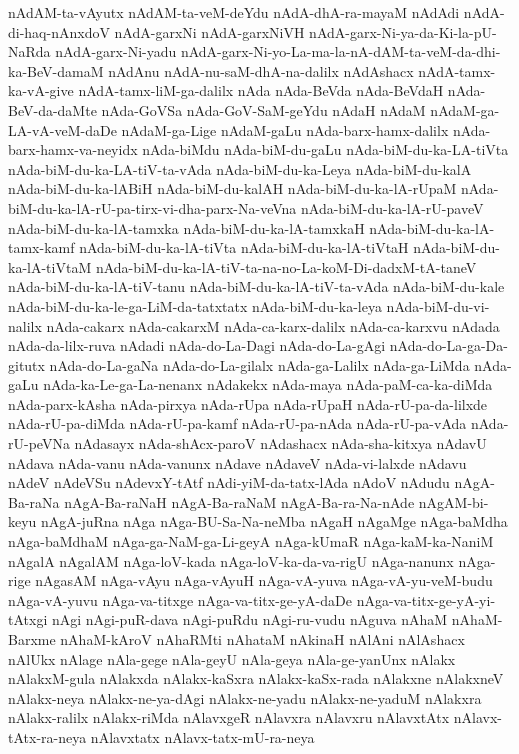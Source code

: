 {nAdAM-ta-vAyutx
nAdAM-ta-veM-deYdu
nAdA-dhA-ra-mayaM
nAdAdi
nAdA-di-haq-nAnxdoV
nAdA-garxNi
nAdA-garxNiVH
nAdA-garx-Ni-ya-da-Ki-la-pU-NaRda
nAdA-garx-Ni-yadu
nAdA-garx-Ni-yo-La-ma-la-nA-dAM-ta-veM-da-dhi-ka-BeV-damaM
nAdAnu
nAdA-nu-saM-dhA-na-dalilx
nAdAshacx
nAdA-tamx-ka-vA-give
nAdA-tamx-liM-ga-dalilx
nAda
nAda-BeVda
nAda-BeVdaH
nAda-BeV-da-daMte
nAda-GoVSa
nAda-GoV-SaM-geYdu
nAdaH
nAdaM
nAdaM-ga-LA-vA-veM-daDe
nAdaM-ga-Lige
nAdaM-gaLu
nAda-barx-hamx-dalilx
nAda-barx-hamx-va-neyidx
nAda-biMdu
nAda-biM-du-gaLu
nAda-biM-du-ka-LA-tiVta
nAda-biM-du-ka-LA-tiV-ta-vAda
nAda-biM-du-ka-Leya
nAda-biM-du-kalA
nAda-biM-du-ka-lABiH
nAda-biM-du-kalAH
nAda-biM-du-ka-lA-rUpaM
nAda-biM-du-ka-lA-rU-pa-tirx-vi-dha-parx-Na-veVna
nAda-biM-du-ka-lA-rU-paveV
nAda-biM-du-ka-lA-tamxka
nAda-biM-du-ka-lA-tamxkaH
nAda-biM-du-ka-lA-tamx-kamf
nAda-biM-du-ka-lA-tiVta
nAda-biM-du-ka-lA-tiVtaH
nAda-biM-du-ka-lA-tiVtaM
nAda-biM-du-ka-lA-tiV-ta-na-no-La-koM-Di-dadxM-tA-taneV
nAda-biM-du-ka-lA-tiV-tanu
nAda-biM-du-ka-lA-tiV-ta-vAda
nAda-biM-du-kale
nAda-biM-du-ka-le-ga-LiM-da-tatxtatx
nAda-biM-du-ka-leya
nAda-biM-du-vi-nalilx
nAda-cakarx
nAda-cakarxM
nAda-ca-karx-dalilx
nAda-ca-karxvu
nAdada
nAda-da-lilx-ruva
nAdadi
nAda-do-La-Dagi
nAda-do-La-gAgi
nAda-do-La-ga-Da-gitutx
nAda-do-La-gaNa
nAda-do-La-gilalx
nAda-ga-Lalilx
nAda-ga-LiMda
nAda-gaLu
nAda-ka-Le-ga-La-nenanx
nAdakekx
nAda-maya
nAda-paM-ca-ka-diMda
nAda-parx-kAsha
nAda-pirxya
nAda-rUpa
nAda-rUpaH
nAda-rU-pa-da-lilxde
nAda-rU-pa-diMda
nAda-rU-pa-kamf
nAda-rU-pa-nAda
nAda-rU-pa-vAda
nAda-rU-peVNa
nAdasayx
nAda-shAcx-paroV
nAdashacx
nAda-sha-kitxya
nAdavU
nAdava
nAda-vanu
nAda-vanunx
nAdave
nAdaveV
nAda-vi-lalxde
nAdavu
nAdeV
nAdeVSu
nAdevxY-tAtf
nAdi-yiM-da-tatx-lAda
nAdoV
nAdudu
nAgA-Ba-raNa
nAgA-Ba-raNaH
nAgA-Ba-raNaM
nAgA-Ba-ra-Na-nAde
nAgAM-bi-keyu
nAgA-juRna
nAga
nAga-BU-Sa-Na-neMba
nAgaH
nAgaMge
nAga-baMdha
nAga-baMdhaM
nAga-ga-NaM-ga-Li-geyA
nAga-kUmaR
nAga-kaM-ka-NaniM
nAgalA
nAgalAM
nAga-loV-kada
nAga-loV-ka-da-va-rigU
nAga-nanunx
nAga-rige
nAgasAM
nAga-vAyu
nAga-vAyuH
nAga-vA-yuva
nAga-vA-yu-veM-budu
nAga-vA-yuvu
nAga-va-titxge
nAga-va-titx-ge-yA-daDe
nAga-va-titx-ge-yA-yi-tAtxgi
nAgi
nAgi-puR-dava
nAgi-puRdu
nAgi-ru-vudu
nAguva
nAhaM
nAhaM-Barxme
nAhaM-kAroV
nAhaRMti
nAhataM
nAkinaH
nAlAni
nAlAshacx
nAlUkx
nAlage
nAla-gege
nAla-geyU
nAla-geya
nAla-ge-yanUnx
nAlakx
nAlakxM-gula
nAlakxda
nAlakx-kaSxra
nAlakx-kaSx-rada
nAlakxne
nAlakxneV
nAlakx-neya
nAlakx-ne-ya-dAgi
nAlakx-ne-yadu
nAlakx-ne-yaduM
nAlakxra
nAlakx-ralilx
nAlakx-riMda
nAlavxgeR
nAlavxra
nAlavxru
nAlavxtAtx
nAlavx-tAtx-ra-neya
nAlavxtatx
nAlavx-tatx-mU-ra-neya
}
